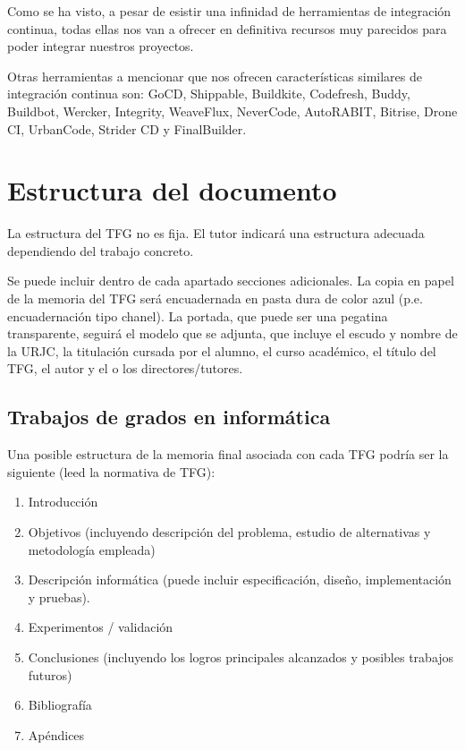 Como se ha visto, a pesar de esistir una infinidad de herramientas de integración continua, todas ellas nos van a ofrecer en definitiva recursos muy parecidos para poder integrar nuestros proyectos.

Otras herramientas a mencionar que nos ofrecen características similares de integración continua son: GoCD, Shippable, Buildkite, Codefresh, Buddy, Buildbot, Wercker, Integrity, WeaveFlux, NeverCode, AutoRABIT, Bitrise, Drone CI, UrbanCode, Strider CD y FinalBuilder.

\section{Estructura del documento}

La estructura del TFG no es fija. El tutor indicará una estructura adecuada dependiendo del trabajo concreto.

Se puede incluir dentro de cada apartado secciones adicionales. La copia en papel de la memoria del TFG será encuadernada en pasta dura de color azul (p.e. encuadernación tipo chanel). La portada, que puede ser una pegatina transparente, seguirá el modelo que se adjunta, que incluye el escudo y nombre de la URJC, la titulación cursada por el alumno, el curso académico, el título del TFG, el autor y el o los directores/tutores.

\subsection{Trabajos de grados en informática}

Una posible estructura de la memoria final asociada con cada TFG podría ser la siguiente (leed la normativa de TFG):
\begin{enumerate}
 \item Introducción
 \item Objetivos (incluyendo descripción del problema, estudio de alternativas y metodología empleada)
 \item Descripción informática (puede incluir especificación, diseño, implementación y pruebas).
 \item Experimentos / validación
 \item Conclusiones (incluyendo los logros principales alcanzados y posibles trabajos futuros)
 \item Bibliografía
 \item Apéndices
\end{enumerate}
